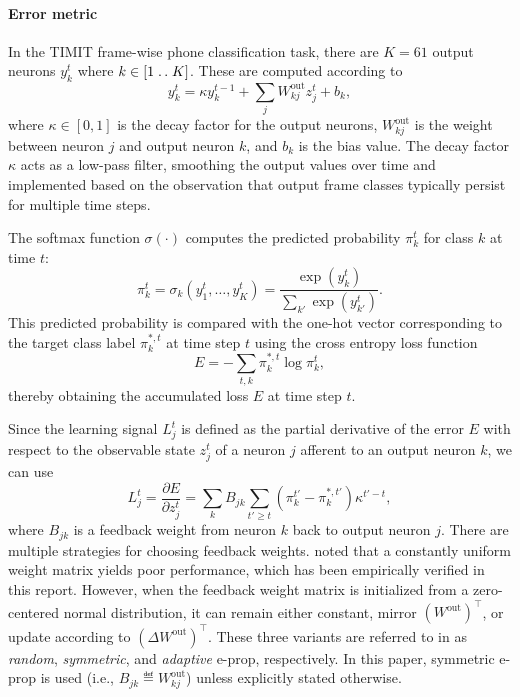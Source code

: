             \paragraph{Error metric}
            In the TIMIT frame-wise phone classification task, there are $K=61$ output neurons $y^t_k$ where $k \in [1\mathrel{{.}\,{.}}\nobreak K]$.
            These are computed according to
            \begin{equation}\label{eq:bellec_y}
            y^t_k = \kappa y^{t-1}_k + \sum_jW^\text{out}_{kj}z^t_j + b_k,
            \end{equation}
            where $\kappa \in [0, 1]$ is the decay factor for the output neurons, $W^\text{out}_{kj}$ is the weight between neuron $j$ and output neuron $k$, and $b_k$ is the bias value.
            The decay factor $\kappa$ acts as a low-pass filter, smoothing the output values over time and implemented based on the observation that output frame classes typically persist for multiple time steps.

            The softmax function $\sigma(\cdot)$ computes the predicted probability $\pi^t_k$ for class $k$ at time $t$:
            \begin{equation}
            \pi^t_k = \sigma_k\left(y^t_1,\ldots,y^t_K\right) = \frac{\exp\left(y^t_k\right)}{\sum_{k'}\exp\left(y^t_{k'}\right)}.
            \end{equation}
            This predicted probability is compared with the one-hot vector corresponding to the target class label $\pi^{*,t}_k$ at time step $t$ using the cross entropy loss function
            \begin{equation}
            E = -\sum_{t,k}\pi^{*,t}_k\log\pi^t_k,
            \end{equation}
            thereby obtaining the accumulated loss $E$ at time step $t$.

            Since the learning signal $L^t_j$ is defined as the partial derivative of the error $E$ with respect to the observable state $z_j^t$ of a neuron $j$ afferent to an output neuron $k$, we can use
            \begin{equation}\label{eq:learningsignal_after_output}
            L^t_j = \frac{\partial E}{\partial z^t_j} = \sum_kB_{jk}\sum_{t'\geq t}\left(\pi^{t'}_k - \pi^{*,t'}_k\right)\kappa^{t'-t},
            \end{equation}
            where $B_{jk}$ is a feedback weight from neuron $k$ back to output neuron $j$.
            There are multiple strategies for choosing feedback weights.
            \citet{bellec2020solution} noted that a constantly uniform weight matrix yields poor performance, which has been empirically verified in this report.
            However, when the feedback weight matrix is initialized from a zero-centered normal distribution, it can remain either constant, mirror $(W^\text{out})^\top$, or update according to $(\Delta W^\text{out})^\top$.
            These three variants are referred to in \citet{bellec2020solution} as \emph{random}, \emph{symmetric}, and \emph{adaptive} e-prop, respectively.
            In this paper, symmetric e-prop is used (i.e., $B_{jk} \eqdef W^\text{out}_{kj}$) unless explicitly stated otherwise.

